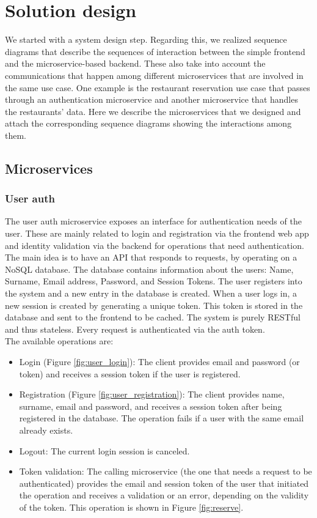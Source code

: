 \section{Solution design}
We started with a system design step.
Regarding this, we realized sequence diagrams
that describe the sequences of interaction between the simple
frontend and the microservice-based backend. These also take
into account the communications that happen among different
microservices that are involved in the same use case. One example
is the restaurant reservation use case that passes
through an authentication microservice and another microservice
that handles the restaurants’ data. Here we describe the microservices
that we designed and attach the corresponding sequence diagrams showing
the interactions among them.

\subsection{Microservices}

\subsubsection{User auth}

The user auth microservice exposes an interface for authentication needs of the
user. These are mainly related to login and registration via the frontend web app
and identity validation via the backend for operations that need authentication.
The main idea is to have an API that responds to requests, by operating on a
NoSQL database. The database contains information about the users: Name, Surname,
Email address, Password, and Session Tokens. The user registers into the system
and a new entry in the database is created. When a user logs in, a new session
is created by generating a unique token. This token is stored in the database
and sent to the frontend to be cached. The system is purely RESTful and thus
stateless. Every request is authenticated via the auth token.\\
The available operations are:
\begin{itemize}
    \item Login (Figure \ref{fig:user_login}): The client provides email and
    password (or token) and receives a session token if the user is registered.
    \item Registration (Figure \ref{fig:user_registration}): The client provides name,
    surname, email and password, and receives a session token after being registered
    in the database. The operation fails if a user with the same email already exists.
    \item Logout: The current login session is canceled.
    \item Token validation: The calling microservice (the one that needs a request to
    be authenticated) provides the email and session token of the user that initiated
    the operation and receives a validation or an error, depending on the validity of
    the token. This operation is shown in Figure \ref{fig:reserve}.
\end{itemize}

